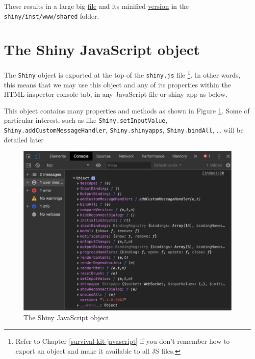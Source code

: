 \documentclass[
]{book}
\newenvironment{Shaded}{\begin{snugshade}}{\end{snugshade}}
\newcommand{\ControlFlowTok}[1]{\textcolor[rgb]{0.13,0.29,0.53}{\textbf{#1}}}
\newcommand{\KeywordTok}[1]{\textcolor[rgb]{0.13,0.29,0.53}{\textbf{#1}}}
\newcommand{\NormalTok}[1]{#1}
\newcommand{\OperatorTok}[1]{\textcolor[rgb]{0.81,0.36,0.00}{\textbf{#1}}}
\newcommand{\StringTok}[1]{\textcolor[rgb]{0.31,0.60,0.02}{#1}}
\begin{document}
These results in a large big \href{https://github.com/rstudio/shiny/blob/master/inst/www/shared/shiny.js}{file} and its minified \href{https://github.com/rstudio/shiny/blob/master/inst/www/shared/shiny.min.js}{version} in the \texttt{shiny/inst/www/shared} folder.

\hypertarget{the-shiny-javascript-object}{%
\section{The Shiny JavaScript object}\label{the-shiny-javascript-object}}

The \texttt{Shiny} object is exported at the top of the \texttt{shiny.js} file \footnote{Refer to Chapter \ref{survival-kit-javascript} if you don't remember how to export an object and make it available to all JS files.}. In other words, this means that we may use this object and any of its properties within the HTML inspector console tab, in any JavaScript file or shiny app as below.

\begin{Shaded}
\end{Shaded}

This object contains many properties and methods as shown in Figure \ref{fig:shiny-object}. Some of particular interest, such as like \texttt{Shiny.setInputValue}, \texttt{Shiny.addCustomMessageHandler}, \texttt{Shiny.shinyapps}, \texttt{Shiny.bindAll}, \ldots{} will be detailed later

\begin{figure}
\includegraphics[width=17.44in]{images/survival-kit/shiny-object} \caption{The Shiny JavaScript object}\label{fig:shiny-object}
\end{figure}
\end{document}
